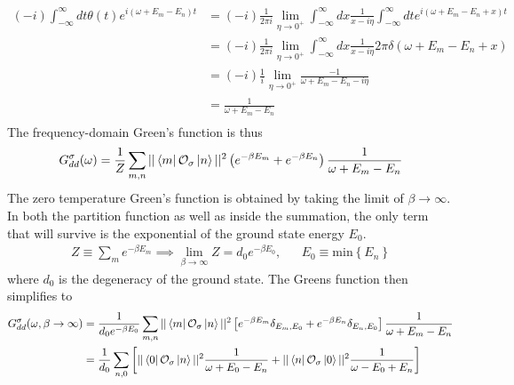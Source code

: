 \documentclass{report}
\numberwithin{equation}{section}
\begin{document}
\begin{appendices}
\begin{equation}
\begin{aligned}
	\left(-i\right)\int_{-\infty}^\infty dt \theta(t)e^{i\left( \omega + E_m - E_n \right)t} &= \left(-i\right)\frac{1}{2\pi i}\lim_{\eta \to 0^+} \int_{-\infty}^\infty dx\frac{1}{x- i\eta}\int_{-\infty}^\infty dt e^{i\left( \omega + E_m - E_n + x\right)t} \\
									     &=\left(-i\right)\frac{1}{2\pi i}\lim_{\eta \to 0^+} \int_{-\infty}^\infty dx\frac{1}{x- i\eta} 2\pi \delta\left( \omega + E_m - E_n + x\right) \\
									     &=\left(-i\right)\frac{1}{i}\lim_{\eta \to 0^+} \frac{-1}{\omega + E_m - E_n- i\eta} \\
									     &=\frac{1}{\omega + E_m - E_n} \\
\end{aligned}\end{equation}
The frequency-domain Green's function is thus
\begin{equation}\begin{aligned}
	G_{d d}^\sigma(\omega) = \frac{1}{Z}\sum_{m,n}||\bra{m}\mathcal{O}_{\sigma}\ket{n}||^2\left( e^{-\beta E_m} + e^{-\beta E_n}\right)\frac{1}{\omega + E_m - E_n}
\end{aligned}\end{equation}
The zero temperature Green's function is obtained by taking the limit of \(\beta \to \infty\). In both the partition function as well as inside the summation, the only term that will survive is the exponential of the ground state energy \(E_0\).
\begin{equation*}\begin{aligned}
	Z \equiv \sum_m e^{-\beta E_m} \implies \lim_{\beta \to \infty}Z = d_0 e^{-\beta E_0}, && E_0 \equiv \text{min}\left\{ E_n \right\} 
\end{aligned}\end{equation*}
where \(d_0\) is the degeneracy of the ground state. The Greens function then simplifies to
\begin{equation}\begin{aligned}
	G_{d d}^\sigma(\omega, \beta \to \infty) &= \frac{1}{d_0e^{-\beta E_0}}\sum_{m,n}||\bra{m}\mathcal{O}_{\sigma}\ket{n}||^2\left[e^{-\beta E_m}\delta_{E_m, E_0} + e^{-\beta E_n}\delta_{E_n, E_0}\right]\frac{1}{\omega + E_m - E_n}\\
						 &= \frac{1}{d_0}\sum_{n,0}\left[||\bra{0}\mathcal{O}_{\sigma}\ket{n}||^2\frac{1}{\omega + E_0 - E_n} + ||\bra{n}\mathcal{O}_{\sigma}\ket{0}||^2\frac{1}{\omega - E_0 + E_n}\right]\\
\end{aligned}\end{equation}

\end{appendices}
\end{document}
